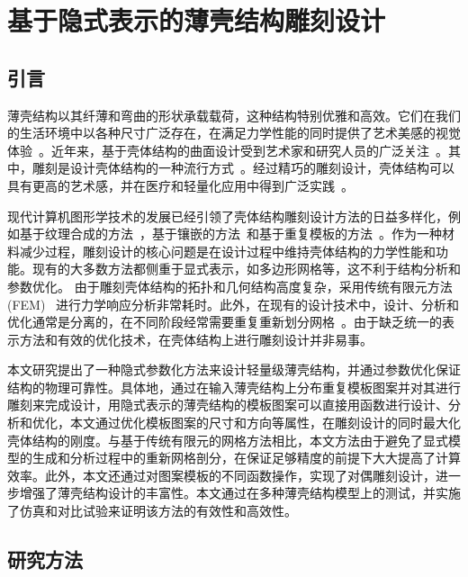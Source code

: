 \chapter{基于隐式表示的薄壳结构雕刻设计}

\section{引言}
薄壳结构以其纤薄和弯曲的形状承载载荷，这种结构特别优雅和高效。它们在我们的生活环境中以各种尺寸广泛存在，在满足力学性能的同时提供了艺术美感的视觉体验~\cite{adriaenssens2014,melaragno2012}。近年来，基于壳体结构的曲面设计受到艺术家和研究人员的广泛关注~\cite{Pietroni2015, Chen2016, Liu2020}。其中，雕刻是设计壳体结构的一种流行方式~\cite{Yang2019,stadlbauer2020}。经过精巧的雕刻设计，壳体结构可以具有更高的艺术感，并在医疗和轻量化应用中得到广泛实践~\cite{Zhang2017,Rao2019}。

现代计算机图形学技术的发展已经引领了壳体结构雕刻设计方法的日益多样化，例如基于纹理合成的方法~\cite{Dumas2015}，基于镶嵌的方法~\cite{Pietroni2015}和基于重复模板的方法~\cite{schumacher2016}。作为一种材料减少过程，雕刻设计的核心问题是在设计过程中维持壳体结构的力学性能和功能。现有的大多数方法都侧重于显式表示，如多边形网格等，这不利于结构分析和参数优化。
由于雕刻壳体结构的拓扑和几何结构高度复杂，采用传统有限元方法(FEM)~\cite{bucalem1997,cirak2002} 进行力学响应分析非常耗时。此外，在现有的设计技术中，设计、分析和优化通常是分离的，在不同阶段经常需要重复重新划分网格~\cite{panetta2019}。由于缺乏统一的表示方法和有效的优化技术，在壳体结构上进行雕刻设计并非易事。

本文研究提出了一种隐式参数化方法来设计轻量级薄壳结构，并通过参数优化保证结构的物理可靠性。具体地，通过在输入薄壳结构上分布重复模板图案并对其进行雕刻来完成设计，用隐式表示的薄壳结构的模板图案可以直接用函数进行设计、分析和优化，本文通过优化模板图案的尺寸和方向等属性，在雕刻设计的同时最大化壳体结构的刚度。与基于传统有限元的网格方法相比，本文方法由于避免了显式模型的生成和分析过程中的重新网格剖分，在保证足够精度的前提下大大提高了计算效率。此外，本文还通过对图案模板的不同函数操作，实现了对偶雕刻设计，进一步增强了薄壳结构设计的丰富性。本文通过在多种薄壳结构模型上的测试，并实施了仿真和对比试验来证明该方法的有效性和高效性。

\section{研究方法}
